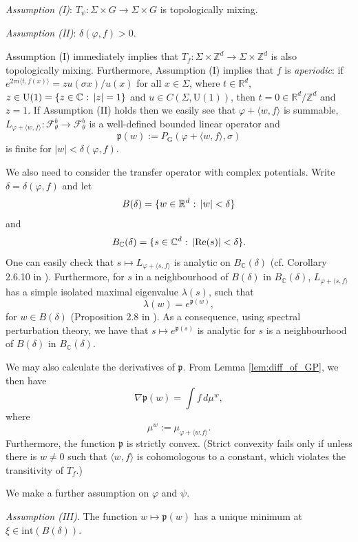 \documentclass[11pt,letterpaper]{amsart}
\theoremstyle{definition}
\numberwithin{equation}{section}
\numberwithin{theorem}{section}
\def\Z{\mathbb{Z}}
\def\R{\mathbb{R}}
\def\C{\mathbb{C}}
\def\vp{\varphi}
\def\R{\mathbb R}
\def\Z{\mathbb Z}
\def\PG{P_{\mathrm{G}}}
\begin{document}
  \medskip
\noindent
\emph{Assumption (I)}:
$T_\psi :\Sigma \times G \to \Sigma \times G$ is topologically mixing.

 
 \medskip
\noindent
\emph{Assumption (II)}:
 $\delta(\vp,f)>0$.
 
 \medskip
 Assumption (I) immediately implies that $T_f : \Sigma \times \Z^d \to \Sigma \times \Z^d$ is also topologically mixing. Furthermore, Assumption (I) implies that $f$ is \emph{aperiodic}:
 if $e^{2\pi i \langle t,f(x)\rangle} = z u(\sigma x)/u(x)$ for all $x \in \Sigma$, where $t \in \R^d$,
 $z \in \mathrm{U}(1) = \{z \in \C \hbox{ : }|z|=1\}$ and $u \in C(\Sigma,\mathrm{U}(1))$, then 
 $t=0\in \R^d/\Z^d$ and $z=1$.
 If Assumption (II) holds then we easily see that $\vp +\langle w,f \rangle$ is summable,
 $L_{\vp + \langle w,f \rangle} : \mathcal F_\theta^b \to \mathcal F_\theta^b$ is a well-defined bounded linear operator and 
 \[
 \mathfrak p(w):=\PG(\vp+\langle w,f \rangle,\sigma)
 \]
 is finite for $|w|<\delta(\vp,f)$.
 
 We also need to consider the transfer operator with complex potentials. Write $\delta=\delta(\vp,f)$ 
 and let 
 \[
 B(\delta)
 = \{w \in \R^d \hbox{ : } |w| < \delta\}
 \]
 and 
 \[
 B_{\C}(\delta) = \{s \in \C^d \hbox{ : } |\mathrm{Re}(s)|<\delta\}.
 \]
 One can easily check that $s \mapsto L_{\vp+\langle s,f\rangle}$ is analytic on
 $B_\C(\delta)$ (cf. Corollary 2.6.10 in \cite{MU2003}). 
 Furthermore, for $s$ in a neighbourhood of $B(\delta)$ in $B_\C(\delta)$,
 $L_{\vp +\langle s,f\rangle}$ has a simple isolated maximal eigenvalue $\lambda(s)$,
 such that 
 \[
\lambda(w) = e^{\mathfrak p(w)},
 \]
 for $w \in B(\delta)$ (Proposition 2.8 in \cite{KK}). As a consequence, 
 using spectral perturbation theory, we have that
 $s \mapsto e^{\mathfrak p(s)}$ is analytic for $s$ is a neighbourhood of $B(\delta)$ in $B_\C(\delta)$.
 


We may also calculate the derivatives of $\mathfrak p$. 
From Lemma \ref{lem:diff_of_GP}, we then have
\[
\nabla \mathfrak p(w)= \int f \, d\mu^{w},
\]
where 
\[
\mu^w := \mu_{\vp + \langle w.f \rangle}.
\]
Furthermore, the function $\mathfrak p$ is strictly convex. (Strict convexity fails only if unless there is $w \ne 0$ such that
$\langle w,f \rangle$ is cohomologous to a constant, which violates the transitivity of $T_f$.)

 
 \medskip

We make a further assumption on $\vp$ and $\psi$.

\medskip
 \noindent
 \emph{Assumption (III)}.
The function $w \mapsto \mathfrak p(w)$ has a unique minimum at $\xi \in \mathrm{int}(B(\delta))$.
\end{document}
